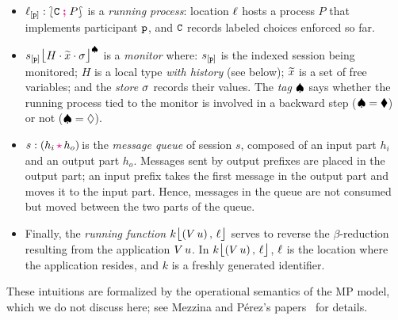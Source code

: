 \documentclass[runningheads,plain]{llncs}
\begin{document}
\begin{itemize}
\item  $\ell_{[\mathtt{p}]}:\lbag \mathtt{C} \; \textcolor{magenta}{\textbf{;}}\; P \rbag$ is a \emph{running process}:  location $\ell$ hosts a process $P$ that implements participant $\mathtt{p}$, and $\mathtt{C}$ records labeled choices enforced so far. 

\item ${s_{[\mathtt{p}]}\mbox{{\large $\lfloor$}} \textcolor{black}{H}\cdot \widetilde{x}\cdot \sigma \mbox{{\large $\rfloor$}}^{\spadesuit}}$ is a \emph{monitor}
where: 
$s_{[\mathtt{p}]}$ is the indexed session being monitored;
$H$ is a  local type \emph{with history} (see below);
$\widetilde{x}$ is a set of free variables;
and the \emph{store} $\sigma$ records their values.
The \emph{tag} $\spadesuit$ says whether 
the running process tied to the monitor is involved in a backward step ($\spadesuit = \blacklozenge$) or not ($\spadesuit = \lozenge$).

\item   $\codah{s}{h_i}{h_o}$ is the \emph{message queue} of session $s$, composed of an input part $h_i$ and an output part $h_o$.
Messages sent by output prefixes are placed in the output part; an input prefix takes the first message in the output part and moves it to the input part. Hence, messages in the queue are not consumed but moved between the two parts of the queue.

\item Finally, the \emph{running function} $k\mbox{{\large $\lfloor$}} (V\, {u})\,,\, \ell \mbox{{\large $\rfloor$}}$ serves to reverse the $\beta$-reduction resulting from the application $V\, {u}$. In $k\mbox{{\large $\lfloor$}} (V\, {u})\,,\, \ell \mbox{{\large $\rfloor$}}$, 
 $\ell$ is the location where the application resides, and 
  $k$ is a freshly generated identifier.
\end{itemize}
These intuitions are formalized by the operational semantics of the MP model, which we do not discuss here; see Mezzina and P\'{e}rez's papers~\cite{DBLP:conf/ppdp/MezzinaP17,DBLP:journals/corr/MezzinaP17} for details.
\end{document}
